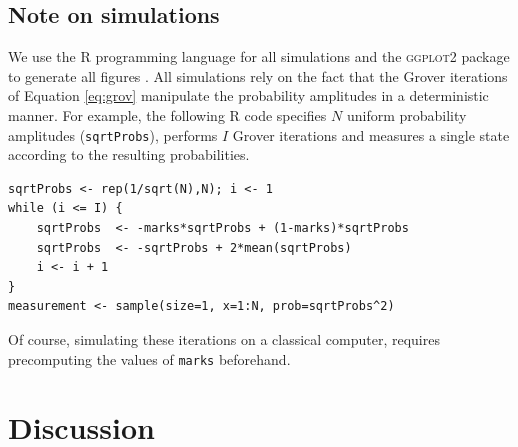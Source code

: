 \documentclass[12pt]{article} %
\begin{document}

\subsection{Note on simulations}

We use the \textsc{R} programming language \citep{rlang} for all simulations and the \textsc{ggplot2} package to generate all figures \citep{ggplot}.  All simulations rely on the fact that the Grover iterations of Equation \eqref{eq:grov} manipulate the probability amplitudes in a deterministic manner. For example, the following \textsc{R} code specifies $N$ uniform probability amplitudes (\verb|sqrtProbs|), performs $I$ Grover iterations and measures a single state according to the resulting probabilities.
\begin{verbatim}
sqrtProbs <- rep(1/sqrt(N),N); i <- 1
while (i <= I) {
	sqrtProbs  <- -marks*sqrtProbs + (1-marks)*sqrtProbs
	sqrtProbs  <- -sqrtProbs + 2*mean(sqrtProbs)
	i <- i + 1
}
measurement <- sample(size=1, x=1:N, prob=sqrtProbs^2)
\end{verbatim}
Of course, simulating these iterations on a classical computer, requires precomputing the values of \verb|marks| beforehand.


\section{Discussion}
\end{document}
